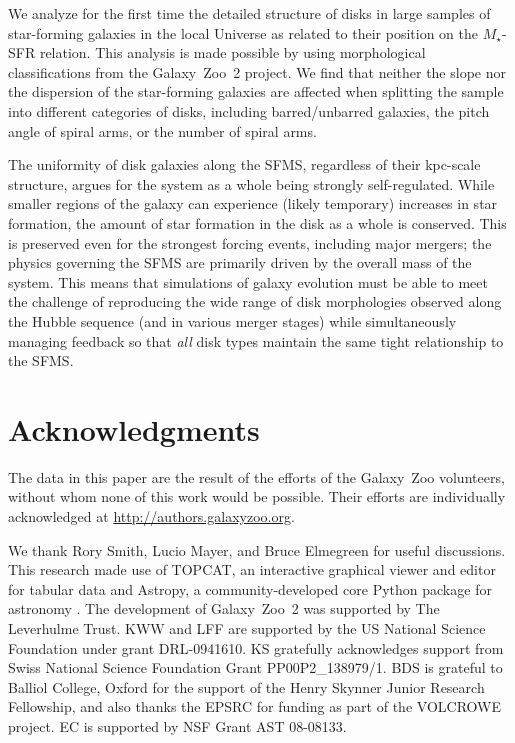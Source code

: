 \documentclass[useAMS,usenatbib]{mn2e}
\begin{document}
We analyze for the first time the detailed structure of disks in large samples of star-forming galaxies in the local Universe as related to their position on the $M_\star$-SFR relation. This analysis is made possible by using morphological classifications from the Galaxy~Zoo~2 project. We find that neither the slope nor the dispersion of the star-forming galaxies are affected when splitting the sample into different categories of disks, including barred/unbarred galaxies, the pitch angle of spiral arms, or the number of spiral arms. 

The uniformity of disk galaxies along the SFMS, regardless of their kpc-scale structure, argues for the system as a whole being strongly self-regulated. While smaller regions of the galaxy can experience (likely temporary) increases in star formation, the amount of star formation in the disk as a whole is conserved. This is preserved even for the strongest forcing events, including major mergers; the physics governing the SFMS are primarily driven by the overall mass of the system. This means that simulations of galaxy evolution must be able to meet the challenge of reproducing the wide range of disk morphologies observed along the Hubble sequence (and in various merger stages) while simultaneously managing feedback so that \emph{all} disk types maintain the same tight relationship to the SFMS.


\section*{Acknowledgments}

The data in this paper are the result of the efforts of the Galaxy~Zoo volunteers, without whom none of this work would be possible. Their efforts are individually acknowledged at \url{http://authors.galaxyzoo.org}. 

We thank Rory Smith, Lucio Mayer, and Bruce Elmegreen for useful discussions. This research made use of TOPCAT, an interactive graphical viewer and editor for tabular data \citep{tay05} and Astropy, a community-developed core Python package for astronomy \citep{ast13}. The development of Galaxy~Zoo~2 was supported by The Leverhulme Trust. KWW and LFF are supported by the US National Science Foundation under grant DRL-0941610. KS gratefully acknowledges support from Swiss National Science Foundation Grant PP00P2\_138979/1. BDS is grateful to Balliol College, Oxford for the support of the Henry Skynner Junior Research Fellowship, and also thanks the EPSRC for funding as part of the VOLCROWE project. EC is supported by NSF Grant AST 08-08133.
\end{document}
